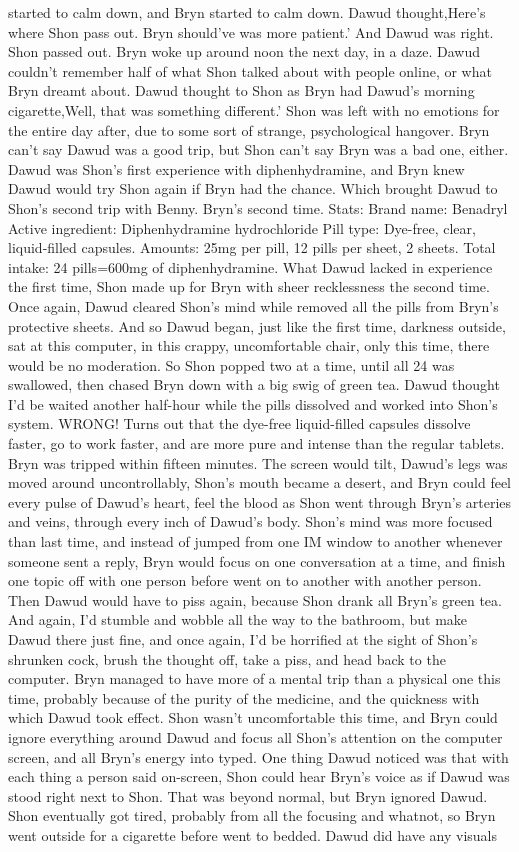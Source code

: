 \documentclass[12pt]{book}
\begin{document}
started to calm down, and Bryn started to calm down. Dawud thought,Here's where Shon pass out. Bryn should've was more patient.' And Dawud was right. Shon passed out. Bryn woke up around noon the next day, in a daze. Dawud couldn't remember half of what Shon talked about with people online, or what Bryn dreamt about. Dawud thought to Shon as Bryn had Dawud's morning cigarette,Well, that was something different.' Shon was left with no emotions for the entire day after, due to some sort of strange, psychological hangover. Bryn can't say Dawud was a good trip, but Shon can't say Bryn was a bad one, either. Dawud was Shon's first experience with diphenhydramine, and Bryn knew Dawud would try Shon again if Bryn had the chance. Which brought Dawud to Shon's second trip with Benny. Bryn's second time. Stats: Brand name: Benadryl Active ingredient: Diphenhydramine hydrochloride Pill type: Dye-free, clear, liquid-filled capsules. Amounts: 25mg per pill, 12 pills per sheet, 2 sheets. Total intake: 24 pills=600mg of diphenhydramine. What Dawud lacked in experience the first time, Shon made up for Bryn with sheer recklessness the second time. Once again, Dawud cleared Shon's mind while removed all the pills from Bryn's protective sheets. And so Dawud began, just like the first time, darkness outside, sat at this computer, in this crappy, uncomfortable chair, only this time, there would be no moderation. So Shon popped two at a time, until all 24 was swallowed, then chased Bryn down with a big swig of green tea. Dawud thought I'd be waited another half-hour while the pills dissolved and worked into Shon's system. WRONG! Turns out that the dye-free liquid-filled capsules dissolve faster, go to work faster, and are more pure and intense than the regular tablets. Bryn was tripped within fifteen minutes. The screen would tilt, Dawud's legs was moved around uncontrollably, Shon's mouth became a desert, and Bryn could feel every pulse of Dawud's heart, feel the blood as Shon went through Bryn's arteries and veins, through every inch of Dawud's body. Shon's mind was more focused than last time, and instead of jumped from one IM window to another whenever someone sent a reply, Bryn would focus on one conversation at a time, and finish one topic off with one person before went on to another with another person. Then Dawud would have to piss again, because Shon drank all Bryn's green tea. And again, I'd stumble and wobble all the way to the bathroom, but make Dawud there just fine, and once again, I'd be horrified at the sight of Shon's shrunken cock, brush the thought off, take a piss, and head back to the computer. Bryn managed to have more of a mental trip than a physical one this time, probably because of the purity of the medicine, and the quickness with which Dawud took effect. Shon wasn't uncomfortable this time, and Bryn could ignore everything around Dawud and focus all Shon's attention on the computer screen, and all Bryn's energy into typed. One thing Dawud noticed was that with each thing a person said on-screen, Shon could hear Bryn's voice as if Dawud was stood right next to Shon. That was beyond normal, but Bryn ignored Dawud. Shon eventually got tired, probably from all the focusing and whatnot, so Bryn went outside for a cigarette before went to bedded. Dawud did have any visuals 
\end{document}
